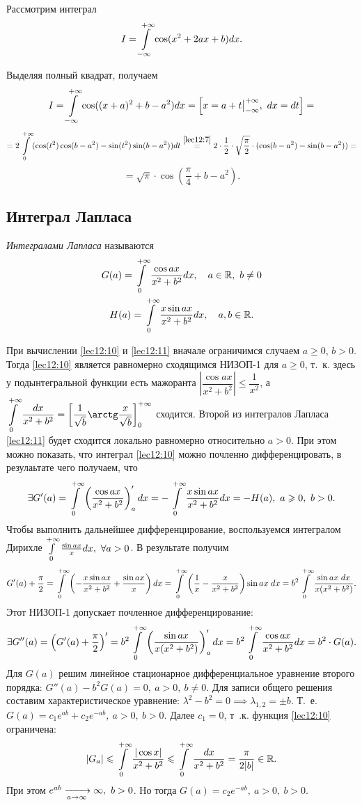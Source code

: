 \documentclass[../../main.tex]{subfiles}
\begin{document}
\begin{exmp}
Рассмотрим интеграл \[I = \int\limits_{-\infty}^{+\infty} \cos(x^2 + 2ax + b) dx.\]

Выделяя полный квадрат, получаем \[I = \int\limits_{-\infty}^{+\infty} \cos((x+a)^2 + b - a^2)dx = \left[x = a + t\big|_{-\infty}^{+\infty},\ dx = dt\right] =\]\[= 2 \ioinf (\cos(t^2)\cos(b-a^2) - \sin(t^2)\sin(b-a^2)) dt \stk{lec12:7}= 2\cdot\frac12\cdot \sqrt{\frac\pi2} \cdot (\cos(b - a^2) - \sin(b - a^2)) =\]\[ = \sqrt{\pi} \cdot\cos\left(\frac{\pi}4 + b - a^2\right).\]
\end{exmp}

\subsection{Интеграл Лапласа}

\emph{Интегралами Лапласа} называются
\begin{gather}
\label{lec12:10}
G(a) = \int\limits_{0}^{+\infty} \frac{\cos ax}{x^2 + b^2} dx,\quad a \in \mathbb{R},\ b \ne 0 \\
\label{lec12:11}
H(a) = \int\limits_{0}^{+\infty} \frac{x\sin ax}{x^2 + b^2} dx,\quad a, b \in \mathbb{R}. 
\end{gather}

При вычислении \eqref{lec12:10} и \eqref{lec12:11} вначале ограничимся случаем $a \ge 0$, $b > 0$. Тогда \eqref{lec12:10} является равномерно сходящимся НИЗОП-1 для $a \ge 0$, т.~к. здесь у подынтегральной функции есть мажоранта $\left|\dfrac{\cos{ax}}{x^2 + b^2}\right| \le \dfrac1{x^2}$, а $\displaystyle\ioinf \frac{dx}{x^2 + b^2} = \left[\frac1{\sqrt b}\arctg\frac x{\sqrt b}\right]_0^{+\infty}$ сходится. Второй из интегралов Лапласа \eqref{lec12:11} будет сходится локально равномерно относительно $a > 0$. При этом можно показать, что интеграл \eqref{lec12:10}  можно почленно дифференцировать, в резулаьтате чего получаем, что
\[\exists G'(a) = \int\limits_{0}^{+\infty} \left(\frac{\cos ax}{x^2 + b^2}\right)'_a dx = -\int\limits_{0}^{+\infty} \frac{x\sin ax}{x^2+b^2} dx = -H(a),\ a \geqslant 0,\ b > 0.\]
Чтобы выполнить дальнейшее дифференцирование, воспользуемся интегралом Дирихле $\int\limits_{0}^{+\infty} \frac{\sin ax}x dx,\ \forall a > 0$. В результате получим \[G'(a) + \frac\pi2 = \int\limits_{0}^{+\infty} \left(-\frac{x \sin ax}{x^2 + b^2} + \frac{\sin ax}{x}\right)dx = \int\limits_{0}^{+\infty} \left(\frac1x - \frac{x}{x^2+b^2}\right)\sin ax\;dx = b^2 \int\limits_{0}^{+\infty} \frac{\sin ax\;dx}{x(x^2 + b^2)}.\]
Этот НИЗОП-1 допускает почленное дифференцирование:
\[\exists G''(a) = \left(G'(a) + \frac{\pi}2\right)' = b^2 \int\limits_{0}^{+\infty} \left(\frac{\sin ax} {x(x^2 + b^2)}\right)'_a dx = b^2 \int\limits_{0}^{+\infty} \frac{\cos ax} {x^2 + b^2} dx = b^2\cdot G(a).\]
Для $G(a)$ решим линейное стационарное дифференциальное уравнение второго порядка: $G''(a) - b^2G(a) = 0,\ a > 0,\ b \ne 0$. Для записи общего решения составим характеристическое уравнение: $\lambda^2 - b^2 = 0 \implies \lambda_{1, 2} = \pm b$. Т.~е. $G(a) = c_1e^{ab} + c_2e^{-ab},\ a > 0,\ b > 0$. Далее $c_1 = 0$, т~.к. функция \eqref{lec12:10} ограничена:
\[|G_a| \leqslant \int\limits_{0}^{+\infty} \frac{|\cos x|}{x^2 + b^2} \leqslant \int\limits_{0}^{+\infty} \frac{dx}{x^2 + b^2} = \frac\pi{2|b|} \in \mathbb{R}.\] При этом $e^{ab} \appr{a\to \infty} \infty,\ b>0$. Но тогда $G(a) = c_2e^{-ab},\ a > 0,\ b > 0$.
\end{document}
